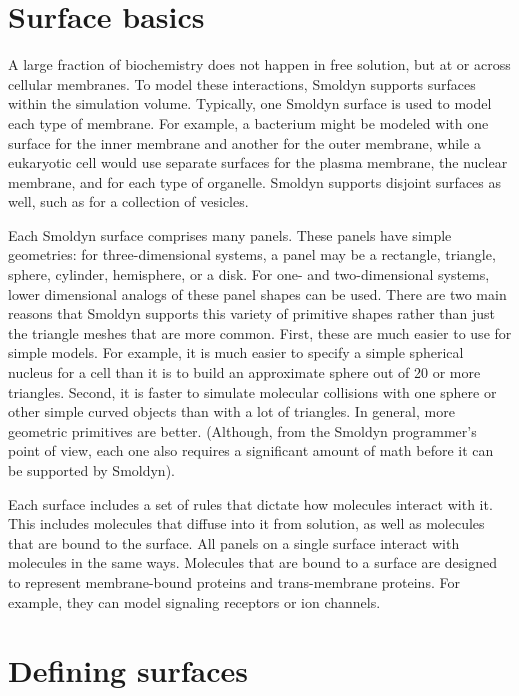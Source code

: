 \documentclass {scrbook}
\begin{document}
\section{Surface basics}

A large fraction of biochemistry does not happen in free solution, but at or across cellular membranes. To model these interactions, Smoldyn supports surfaces within the simulation volume. Typically, one Smoldyn surface is used to model each type of membrane. For example, a bacterium might be modeled with one surface for the inner membrane and another for the outer membrane, while a eukaryotic cell would use separate surfaces for the plasma membrane, the nuclear membrane, and for each type of organelle. Smoldyn supports disjoint surfaces as well, such as for a collection of vesicles.

Each Smoldyn surface comprises many panels. These panels have simple geometries: for three-dimensional systems, a panel may be a rectangle, triangle, sphere, cylinder, hemisphere, or a disk. For one- and two-dimensional systems, lower dimensional analogs of these panel shapes can be used. There are two main reasons that Smoldyn supports this variety of primitive shapes rather than just the triangle meshes that are more common. First, these are much easier to use for simple models. For example, it is much easier to specify a simple spherical nucleus for a cell than it is to build an approximate sphere out of 20 or more triangles. Second, it is faster to simulate molecular collisions with one sphere or other simple curved objects than with a lot of triangles. In general, more geometric primitives are better. (Although, from the Smoldyn programmer's point of view, each one also requires a significant amount of math before it can be supported by Smoldyn).

Each surface includes a set of rules that dictate how molecules interact with it. This includes molecules that diffuse into it from solution, as well as molecules that are bound to the surface. All panels on a single surface interact with molecules in the same ways. Molecules that are bound to a surface are designed to represent membrane-bound proteins and trans-membrane proteins. For example, they can model signaling receptors or ion channels.

\section{Defining surfaces}
\end{document}
